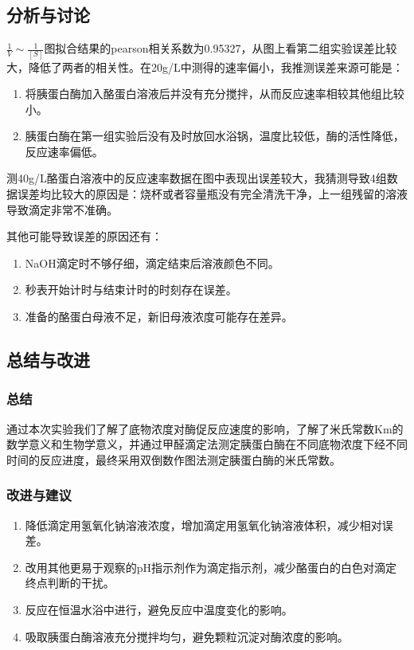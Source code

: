 \documentclass[UTF8]{ctexart}
\begin{document}
        \subsection{分析与讨论}
        $\frac{1}{V} \sim \frac{1}{[S]}$图拟合结果的pearson相关系数为0.95327，从图上看第二组实验误差比较大，降低了两者的相关性。在20g/L中测得的速率偏小，我推测误差来源可能是：
        \begin{enumerate}
            \item 将胰蛋白酶加入酪蛋白溶液后并没有充分搅拌，从而反应速率相较其他组比较小。
            \item 胰蛋白酶在第一组实验后没有及时放回水浴锅，温度比较低，酶的活性降低，反应速率偏低。
        \end{enumerate}

        测40g/L酪蛋白溶液中的反应速率数据在图中表现出误差较大，我猜测导致4组数据误差均比较大的原因是：烧杯或者容量瓶没有完全清洗干净，上一组残留的溶液导致滴定非常不准确。

        其他可能导致误差的原因还有：
        \begin{enumerate}
            \item NaOH滴定时不够仔细，滴定结束后溶液颜色不同。
            \item 秒表开始计时与结束计时的时刻存在误差。
            \item 准备的酪蛋白母液不足，新旧母液浓度可能存在差异。
        \end{enumerate}
        \subsection{总结与改进}
        \subsubsection{总结}
        通过本次实验我们了解了底物浓度对酶促反应速度的影响，了解了米氏常数Km的数学意义和生物学意义，并通过甲醛滴定法测定胰蛋白酶在不同底物浓度下经不同时间的反应进度，最终采用双倒数作图法测定胰蛋白酶的米氏常数。
        \subsubsection{改进与建议}
        \begin{enumerate}
            \item 降低滴定用氢氧化钠溶液浓度，增加滴定用氢氧化钠溶液体积，减少相对误差。
            \item 改用其他更易于观察的pH指示剂作为滴定指示剂，减少酪蛋白的白色对滴定终点判断的干扰。
            \item 反应在恒温水浴中进行，避免反应中温度变化的影响。
            \item 吸取胰蛋白酶溶液充分搅拌均匀，避免颗粒沉淀对酶浓度的影响。
        \end{enumerate}
\end{document}
